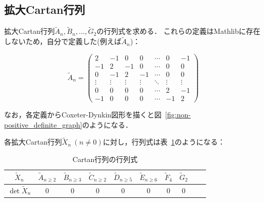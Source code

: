 \subsection{拡大Cartan行列}

拡大Cartan行列$\widetilde{A}_n, \widetilde{B}_n, \ldots, \widetilde{G}_2$の行列式を求める．
これらの定義はMathlibに存在しないため，自分で定義した(例えば$\widetilde{A}_n$)：

\begin{definition}
  \label{def:CartanMatrix.A_tilda}
  \leanok
  \begin{equation}
    \widetilde{A}_n = \begin{pmatrix}
      2  & -1 & 0  & 0  & \cdots & 0  & -1 \\
      -1 & 2  & -1 & 0  & \cdots & 0  & 0 \\
      0  & -1 & 2  & -1 & \cdots & 0  & 0 \\
      \vdots & \vdots & \vdots & \vdots & \ddots & \vdots & \vdots \\
      0  & 0  & 0  & 0  & \cdots & 2  & -1 \\
      -1 & 0  & 0  & 0  & \cdots & -1 & 2
    \end{pmatrix}
  \end{equation}
\end{definition}

なお，各定義からCoxeter-Dynkin図形を描くと図~\ref{fig:non-positive_definite_graph}のようになる．

\begin{theorem}
  \label{thm:CartanMatrix.det_A_tilda}
  \leanok
  各拡大Cartan行列$\widetilde{X}_n\ (n \ne 0)$に対し，行列式は表~\ref{table:CartanMatrix.det_A_tilda}のようになる：
  \begin{table}[htbp]
    \centering
    \caption{Cartan行列の行列式}
    \label{table:CartanMatrix.det_A_tilda}
    \begin{tabular}{c|ccccccccc}
      $\widetilde{X}_n$ & $\widetilde{A}_{n \ge 2}$ & $\widetilde{B}_{n \ge 3}$ & $\widetilde{C}_{n \ge 2}$ & $\widetilde{D}_{n \ge 5}$ & $\widetilde{E}_{n \ge 6}$ & $\widetilde{F}_4$ & $\widetilde{G}_2$ \\ \hline
      $\det \widetilde{X}_n$ & $0$ & $0$ & $0$ & $0$ & $0$ & $0$ & $0$
    \end{tabular}
  \end{table}
\end{theorem}

